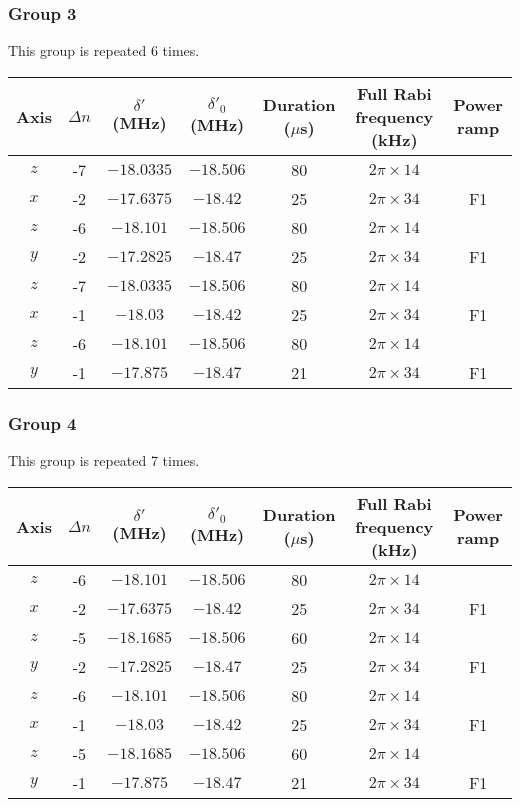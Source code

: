 \documentclass[aps,secnumarabic,amsmath,amssymb]{revtex4}
\begin{document}
\subsubsection{Group 3}
This group is repeated 6 times.
\begin{center}
  \begin{tabular}{|c|c|c|c|c|c|c|}
    \hline
    Axis&$\Delta n$&$\delta'$ (MHz)&$\delta'_0$ (MHz)&Duration ($\mu$s)&Full Rabi frequency (kHz)&Power ramp\\\hline
    $z$&-7&$-18.0335$&$-18.506$&80&$2\pi\times14$&\\\hline
    $x$&-2&$-17.6375$&$-18.42$&25&$2\pi\times34$&F1\\\hline
    $z$&-6&$-18.101$&$-18.506$&80&$2\pi\times14$&\\\hline
    $y$&-2&$-17.2825$&$-18.47$&25&$2\pi\times34$&F1\\\hline
    $z$&-7&$-18.0335$&$-18.506$&80&$2\pi\times14$&\\\hline
    $x$&-1&$-18.03$&$-18.42$&25&$2\pi\times34$&F1\\\hline
    $z$&-6&$-18.101$&$-18.506$&80&$2\pi\times14$&\\\hline
    $y$&-1&$-17.875$&$-18.47$&21&$2\pi\times34$&F1\\\hline
  \end{tabular}
\end{center}

\newpage
\subsubsection{Group 4}
This group is repeated 7 times.
\begin{center}
  \begin{tabular}{|c|c|c|c|c|c|c|}
    \hline
    Axis&$\Delta n$&$\delta'$ (MHz)&$\delta'_0$ (MHz)&Duration ($\mu$s)&Full Rabi frequency (kHz)&Power ramp\\\hline
    $z$&-6&$-18.101$&$-18.506$&80&$2\pi\times14$&\\\hline
    $x$&-2&$-17.6375$&$-18.42$&25&$2\pi\times34$&F1\\\hline
    $z$&-5&$-18.1685$&$-18.506$&60&$2\pi\times14$&\\\hline
    $y$&-2&$-17.2825$&$-18.47$&25&$2\pi\times34$&F1\\\hline
    $z$&-6&$-18.101$&$-18.506$&80&$2\pi\times14$&\\\hline
    $x$&-1&$-18.03$&$-18.42$&25&$2\pi\times34$&F1\\\hline
    $z$&-5&$-18.1685$&$-18.506$&60&$2\pi\times14$&\\\hline
    $y$&-1&$-17.875$&$-18.47$&21&$2\pi\times34$&F1\\\hline
  \end{tabular}
\end{center}
\end{document}
